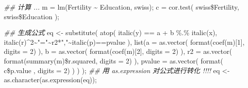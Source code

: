 \documentclass[
]{article}
\newenvironment{Shaded}{}{}
\newcommand{\AttributeTok}[1]{\textcolor[rgb]{0.49,0.56,0.16}{#1}}
\newcommand{\DecValTok}[1]{\textcolor[rgb]{0.25,0.63,0.44}{#1}}
\newcommand{\DocumentationTok}[1]{\textcolor[rgb]{0.73,0.13,0.13}{\textit{#1}}}
\newcommand{\FunctionTok}[1]{\textcolor[rgb]{0.02,0.16,0.49}{#1}}
\newcommand{\NormalTok}[1]{#1}
\newcommand{\OtherTok}[1]{\textcolor[rgb]{0.00,0.44,0.13}{#1}}
\newcommand{\SpecialCharTok}[1]{\textcolor[rgb]{0.25,0.44,0.63}{#1}}
\newcommand{\StringTok}[1]{\textcolor[rgb]{0.25,0.44,0.63}{#1}}
\begin{document}
\begin{Shaded}
\begin{Highlighting}[]
\DocumentationTok{\#\# 计算 ... }
\NormalTok{m }\OtherTok{=} \FunctionTok{lm}\NormalTok{(Fertility }\SpecialCharTok{\textasciitilde{}}\NormalTok{ Education, swiss);}
\NormalTok{c }\OtherTok{=} \FunctionTok{cor.test}\NormalTok{( swiss}\SpecialCharTok{\$}\NormalTok{Fertility, swiss}\SpecialCharTok{\$}\NormalTok{Education );}

\DocumentationTok{\#\# 生成公式}
\NormalTok{eq }\OtherTok{\textless{}{-}} \FunctionTok{substitute}\NormalTok{( }\FunctionTok{atop}\NormalTok{( }\FunctionTok{italic}\NormalTok{(y) }\SpecialCharTok{==}\NormalTok{ a }\SpecialCharTok{+}\NormalTok{ b }\SpecialCharTok{\%.\%} \FunctionTok{italic}\NormalTok{(x),}
                            \FunctionTok{italic}\NormalTok{(r)}\SpecialCharTok{\^{}}\DecValTok{2}\SpecialCharTok{\textasciitilde{}}\StringTok{"="}\SpecialCharTok{\textasciitilde{}}\NormalTok{r2}\SpecialCharTok{*}\StringTok{","}\SpecialCharTok{\textasciitilde{}}\FunctionTok{italic}\NormalTok{(p)}\SpecialCharTok{==}\NormalTok{pvalue ),}
                      \FunctionTok{list}\NormalTok{(}\AttributeTok{a =} \FunctionTok{as.vector}\NormalTok{( }\FunctionTok{format}\NormalTok{(}\FunctionTok{coef}\NormalTok{(m)[}\DecValTok{1}\NormalTok{], }\AttributeTok{digits =} \DecValTok{2}\NormalTok{) ),}
                           \AttributeTok{b =}  \FunctionTok{as.vector}\NormalTok{(  }\FunctionTok{format}\NormalTok{(}\FunctionTok{coef}\NormalTok{(m)[}\DecValTok{2}\NormalTok{], }\AttributeTok{digits =} \DecValTok{2}\NormalTok{) ),}
                           \AttributeTok{r2 =}  \FunctionTok{as.vector}\NormalTok{( }\FunctionTok{format}\NormalTok{(}\FunctionTok{summary}\NormalTok{(m)}\SpecialCharTok{\$}\NormalTok{r.squared, }\AttributeTok{digits =} \DecValTok{2}\NormalTok{) ),}
                           \AttributeTok{pvalue =}  \FunctionTok{as.vector}\NormalTok{( }\FunctionTok{format}\NormalTok{( c}\SpecialCharTok{\$}\NormalTok{p.value , }\AttributeTok{digits =} \DecValTok{2}\NormalTok{) ) )}
\NormalTok{    ); }
\DocumentationTok{\#\# 用 as.expression 对公式进行转化  !!!! }
\NormalTok{eq }\OtherTok{\textless{}{-}} \FunctionTok{as.character}\NormalTok{(}\FunctionTok{as.expression}\NormalTok{(eq));}


\end{Highlighting}
\end{Shaded}
\end{document}
